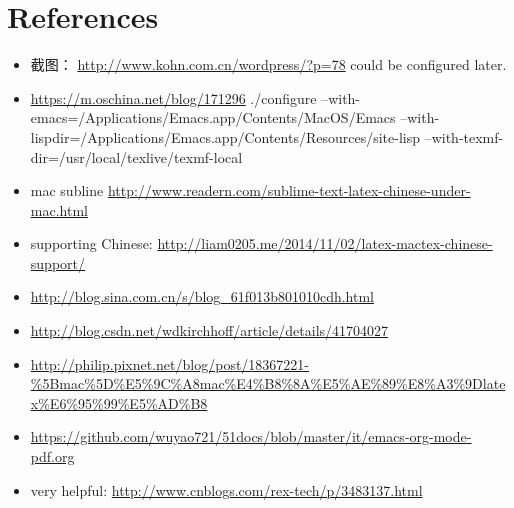 \documentclass[9pt,b5paper]{article}
\begin{document}
\section{References}
\label{sec-3}
\begin{itemize}
\item 截图： \url{http://www.kohn.com.cn/wordpress/?p=78} could be configured later.
\item \url{https://m.oschina.net/blog/171296} ./configure --with-emacs=/Applications/Emacs.app/Contents/MacOS/Emacs --with-lispdir=/Applications/Emacs.app/Contents/Resources/site-lisp --with-texmf-dir=/usr/local/texlive/texmf-local
\item mac subline \url{http://www.readern.com/sublime-text-latex-chinese-under-mac.html}
\item supporting Chinese: \url{http://liam0205.me/2014/11/02/latex-mactex-chinese-support/}
\item \url{http://blog.sina.com.cn/s/blog_61f013b801010cdh.html}
\item \url{http://blog.csdn.net/wdkirchhoff/article/details/41704027}
\item \url{http://philip.pixnet.net/blog/post/18367221-\%5Bmac\%5D\%E5\%9C\%A8mac\%E4\%B8\%8A\%E5\%AE\%89\%E8\%A3\%9Dlatex\%E6\%95\%99\%E5\%AD\%B8}
\item \url{https://github.com/wuyao721/51docs/blob/master/it/emacs-org-mode-pdf.org}
\item very helpful: \url{http://www.cnblogs.com/rex-tech/p/3483137.html}
\end{itemize}
\end{document}
